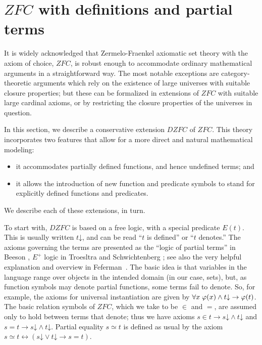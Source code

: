 \documentclass{llncs}
\newcommand{\limplies}{\rightarrow}
\newcommand{\liff}{\leftrightarrow}
\newcommand{\denotes}{\mathord{\downarrow}}
\newcommand{\na}[1]{\mathit{#1}}    \newcommand{\fn}[1]{\mathit{#1}}    \newcommand{\ax}[1]{\mathit{(#1)}}  \newcommand{\mdl}[1]{\mathcal{#1}}
\begin{document}
\section{$\na{ZFC}$ with definitions and partial terms}
\label{dzfc:section}

It is widely acknowledged that Zermelo-Fraenkel axiomatic set theory
with the axiom of choice, $\na{ZFC}$, is robust enough to accommodate
ordinary mathematical arguments in a straightforward way. The most
notable exceptions are category-theoretic arguments which rely on the
existence of large universes with suitable closure properties; but
these can be formalized in extensions of $\na{ZFC}$ with suitable
large cardinal axioms, or by restricting the closure properties of the
universes in question. 

In this section, we describe a conservative extension $\na{DZFC}$ of
$\na{ZFC}$. This theory incorporates two features that allow for a
more direct and natural mathematical modeling:
\begin{itemize}
\item it accommodates partially defined functions, and hence
  undefined terms; and
\item it allows the introduction of new function and predicate
  symbols to stand for explicitly defined functions and predicates.
\end{itemize}
We describe each of these extensions, in turn. 

To start with, $\na{DZFC}$ is based on a free logic, with a special
predicate $E(t)$. This is usually written $t \denotes$, and can be
read ``$t$ is defined'' or ``$t$ denotes.'' The axioms governing the
terms are presented as the ``logic of partial terms'' in Beeson
\cite{beeson:85}, $E^+$ logic in Troesltra and Schwichtenberg
\cite{troelstra:schwichtenberg:00}; see also the very helpful
explanation and overview in Feferman~\cite{feferman:95}. The basic idea
is that variables in the language range over objects in the intended
domain (in our case, sets), but, as function symbols may denote
partial functions, some terms fail to denote. So, for example, the
axioms for universal instantiation are given by $\fa x \ph(x) \land t
\denotes \limplies \ph(t)$. The basic relation symbols of
$\na{ZFC}$, which we take to be $\in$ and $=$, are assumed only to
hold between terms that denote; thus we have axioms $s \in t \limplies
s \denotes \land t \denotes$ and $s = t \limplies s \denotes
\land t \denotes$. Partial equality $s \simeq t$ is defined as usual
by the axiom $s \simeq t \liff (s \denotes \lor t \denotes
\limplies s = t)$. 
\end{document}
